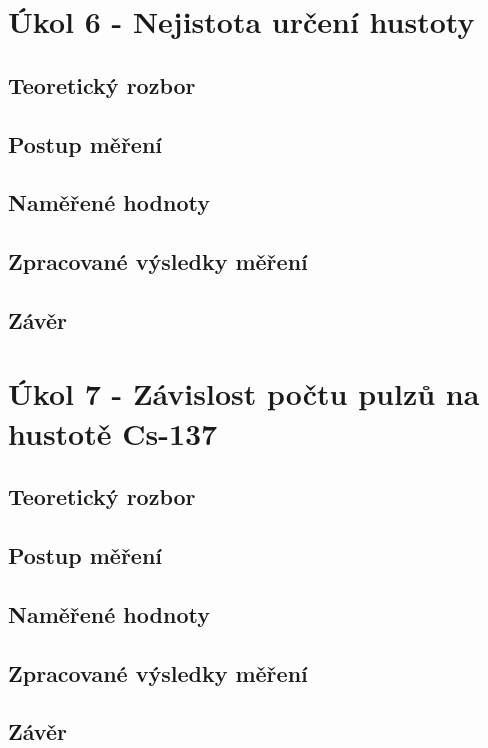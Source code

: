 \documentclass{protokol}
\begin{document}
\pagebreak

\section{Úkol 6 - Nejistota určení hustoty}
    \subsection{Teoretický rozbor}
    \subsection{Postup měření}
    \subsection{Naměřené hodnoty}   
    \subsection{Zpracované výsledky měření}
    \subsection{Závěr}

\pagebreak

\section{Úkol 7 - Závislost počtu pulzů na hustotě Cs-137}
    \subsection{Teoretický rozbor}
    \subsection{Postup měření}
    \subsection{Naměřené hodnoty}   
    \subsection{Zpracované výsledky měření}
    \subsection{Závěr}

\pagebreak
\end{document}
